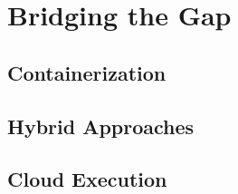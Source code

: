 \chapter{Bridging the Gap}\label{chapter:solutions}

\section{Containerization}

\section{Hybrid Approaches}

\section{Cloud Execution}